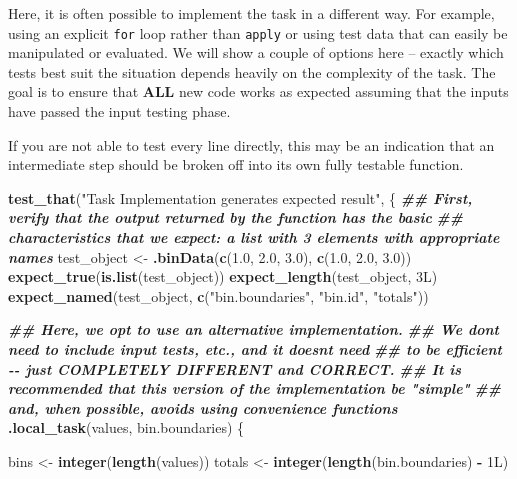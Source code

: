 \documentclass[
]{book}
\newenvironment{Shaded}{\begin{snugshade}}{\end{snugshade}}
\newcommand{\DocumentationTok}[1]{\textcolor[rgb]{0.56,0.35,0.01}{\textbf{\textit{#1}}}}
\newcommand{\FloatTok}[1]{\textcolor[rgb]{0.00,0.00,0.81}{#1}}
\newcommand{\FunctionTok}[1]{\textcolor[rgb]{0.13,0.29,0.53}{\textbf{#1}}}
\newcommand{\NormalTok}[1]{#1}
\newcommand{\OtherTok}[1]{\textcolor[rgb]{0.56,0.35,0.01}{#1}}
\newcommand{\SpecialCharTok}[1]{\textcolor[rgb]{0.81,0.36,0.00}{\textbf{#1}}}
\newcommand{\StringTok}[1]{\textcolor[rgb]{0.31,0.60,0.02}{#1}}
\begin{document}
Here, it is often possible to implement the task in a different way. For example, using an explicit \texttt{for} loop rather than \texttt{apply} or using test data that can easily be manipulated or evaluated. We will show a couple of options here -- exactly which tests best suit the situation depends heavily on the complexity of the task. The goal is to ensure that \textbf{ALL} new code works as expected assuming that the inputs have passed the input testing phase.

If you are not able to test every line directly, this may be an indication that an intermediate step should be broken off into its own fully testable function.

\begin{Shaded}
\begin{Highlighting}[]
\FunctionTok{test\_that}\NormalTok{(}\StringTok{"Task Implementation generates expected result"}\NormalTok{, \{}
  \DocumentationTok{\#\# First, verify that the output returned by the function has the basic}
  \DocumentationTok{\#\# characteristics that we expect: a list with 3 elements with appropriate names}
\NormalTok{  test\_object }\OtherTok{\textless{}{-}} \FunctionTok{.binData}\NormalTok{(}\FunctionTok{c}\NormalTok{(}\FloatTok{1.0}\NormalTok{, }\FloatTok{2.0}\NormalTok{, }\FloatTok{3.0}\NormalTok{), }\FunctionTok{c}\NormalTok{(}\FloatTok{1.0}\NormalTok{, }\FloatTok{2.0}\NormalTok{, }\FloatTok{3.0}\NormalTok{))}
  \FunctionTok{expect\_true}\NormalTok{(}\FunctionTok{is.list}\NormalTok{(test\_object))}
  \FunctionTok{expect\_length}\NormalTok{(test\_object, 3L)}
  \FunctionTok{expect\_named}\NormalTok{(test\_object, }\FunctionTok{c}\NormalTok{(}\StringTok{"bin.boundaries"}\NormalTok{, }\StringTok{"bin.id"}\NormalTok{, }\StringTok{"totals"}\NormalTok{))}
  
  \DocumentationTok{\#\# Here, we opt to use an alternative implementation.}
  \DocumentationTok{\#\#   We don\textquotesingle{}t need to include input tests, etc., and it doesn\textquotesingle{}t need}
  \DocumentationTok{\#\#   to be efficient {-}{-} just COMPLETELY DIFFERENT and CORRECT. }
  \DocumentationTok{\#\#   It is recommended that this version of the implementation be "simple" }
  \DocumentationTok{\#\#   and, when possible, avoids using convenience functions}
  \FunctionTok{.local\_task}\NormalTok{(values, bin.boundaries) \{}
    
\NormalTok{    bins   }\OtherTok{\textless{}{-}} \FunctionTok{integer}\NormalTok{(}\FunctionTok{length}\NormalTok{(values))}
\NormalTok{    totals }\OtherTok{\textless{}{-}} \FunctionTok{integer}\NormalTok{(}\FunctionTok{length}\NormalTok{(bin.boundaries) }\SpecialCharTok{{-}}\NormalTok{ 1L)}
    

\end{Highlighting}
\end{Shaded}
\end{document}
